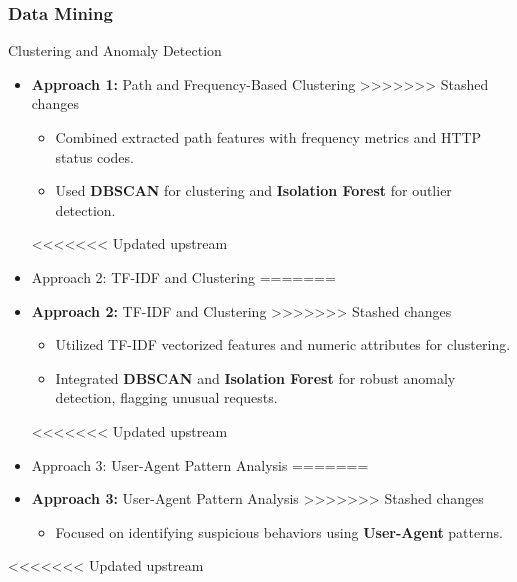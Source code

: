 \documentclass[10pt, a4paper]{beamer}
\begin{document}
	
	\begin{frame}
		\frametitle{Data Mining}
		
		\begin{block}{Clustering and Anomaly Detection}
			
			\begin{itemize}
				\item \textbf{Approach 1:} Path and Frequency-Based Clustering
>>>>>>> Stashed changes
				\begin{itemize}
					\item Combined extracted path features with frequency metrics and HTTP status codes.
					\item Used \textbf{DBSCAN} for clustering and \textbf{Isolation Forest} for outlier detection.
				\end{itemize}
<<<<<<< Updated upstream
				\item Approach 2: TF-IDF and Clustering
=======
				\item \textbf{Approach 2:} TF-IDF and Clustering
>>>>>>> Stashed changes
				\begin{itemize}
					\item Utilized TF-IDF vectorized features and numeric attributes for clustering.
					\item Integrated \textbf{DBSCAN} and \textbf{Isolation Forest} for robust anomaly detection, flagging unusual requests.
				\end{itemize}
				
<<<<<<< Updated upstream
				\item Approach 3: User-Agent Pattern Analysis
=======
				\item \textbf{Approach 3:} User-Agent Pattern Analysis
>>>>>>> Stashed changes
				\begin{itemize}
					\item Focused on identifying suspicious behaviors using \textbf{User-Agent} patterns.
				\end{itemize}
			\end{itemize}
		\end{block}
		
	\end{frame}
<<<<<<< Updated upstream
	
\end{document}
